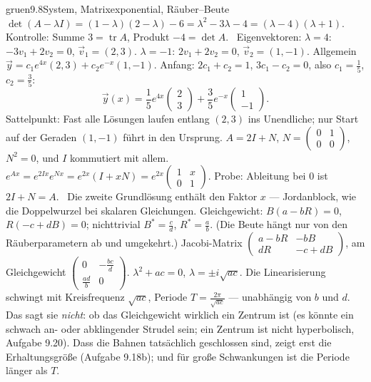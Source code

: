 \begin{loesungkarte}{gruen}{9.8}{System, Matrixexponential, Räuber--Beute}
$\det(A - \lambda I) = (1 - \lambda)(2 - \lambda) - 6 = \lambda^{2} - 3\lambda - 4 = (\lambda - 4)(\lambda + 1)$. Kontrolle: Summe $3 = \operatorname{tr}A$, Produkt $-4 = \det A$. \checkmark\ Eigenvektoren: $\lambda = 4$: $-3v_1 + 2v_2 = 0$, $\vec v_1 = (2, 3)$. $\lambda = -1$: $2v_1 + 2v_2 = 0$, $\vec v_2 = (1, -1)$. Allgemein $\vec y = c_1e^{4x}(2, 3) + c_2e^{-x}(1, -1)$. Anfang: $2c_1 + c_2 = 1$, $3c_1 - c_2 = 0$, also $c_1 = \frac15$, $c_2 = \frac35$:
\[ \vec y(x) = \frac15e^{4x}\begin{pmatrix}2\\3\end{pmatrix} + \frac35e^{-x}\begin{pmatrix}1\\-1\end{pmatrix}. \]
Sattelpunkt: Fast alle Lösungen laufen entlang $(2, 3)$ ins Unendliche; nur Start auf der Geraden $(1, -1)$ führt in den Ursprung.
$A = 2I + N$, $N = \begin{pmatrix}0&1\\0&0\end{pmatrix}$, $N^{2} = 0$, und $I$ kommutiert mit allem. $e^{Ax} = e^{2Ix}e^{Nx} = e^{2x}(I + xN) = e^{2x}\begin{pmatrix}1&x\\0&1\end{pmatrix}$. Probe: Ableitung bei $0$ ist $2I + N = A$. \checkmark\ Die zweite Grundlösung enthält den Faktor $x$ --- Jordanblock, wie die Doppelwurzel bei skalaren Gleichungen.
Gleichgewicht: $B(a - bR) = 0$, $R(-c + dB) = 0$; nichttrivial $B^{*} = \frac cd$, $R^{*} = \frac ab$. (Die Beute hängt nur von den Räuberparametern ab und umgekehrt.) Jacobi-Matrix $\begin{pmatrix}a - bR & -bB\\ dR & -c + dB\end{pmatrix}$, am Gleichgewicht $\begin{pmatrix}0&-\frac{bc}d\\\frac{ad}b&0\end{pmatrix}$. $\lambda^{2} + ac = 0$, $\lambda = \pm i\sqrt{ac}$. Die Linearisierung schwingt mit Kreisfrequenz $\sqrt{ac}$, Periode $T = \frac{2\pi}{\sqrt{ac}}$ --- unabhängig von $b$ und $d$. Das sagt sie \emph{nicht}: ob das Gleichgewicht wirklich ein Zentrum ist (es könnte ein schwach an- oder abklingender Strudel sein; ein Zentrum ist nicht hyperbolisch, Aufgabe 9.20). Dass die Bahnen tatsächlich geschlossen sind, zeigt erst die Erhaltungsgröße (Aufgabe 9.18b); und für große Schwankungen ist die Periode länger als $T$.

\end{loesungkarte}
